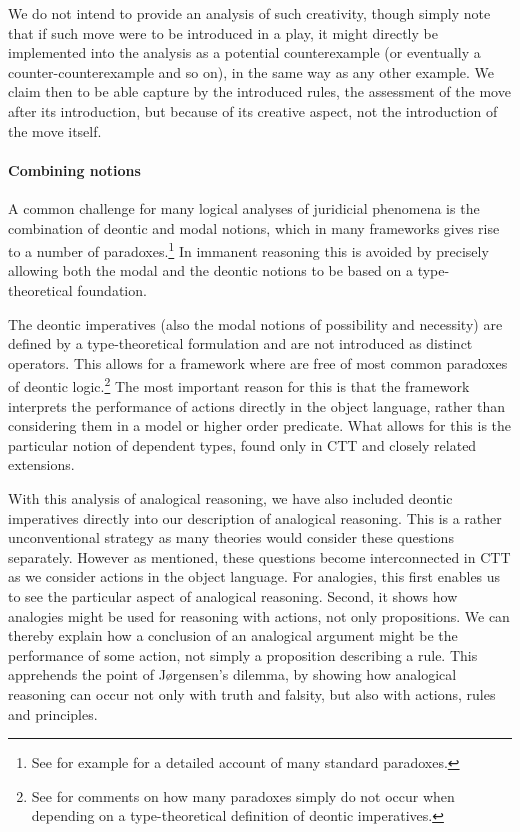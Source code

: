 				We do not intend to provide an analysis of such creativity, though simply note that if such move were to be introduced in a play, it might directly be implemented into the analysis as a potential counterexample (or eventually a counter-counterexample and so on), in the same way as any other example. We claim then to be able capture by the introduced rules, the assessment of the move after its introduction, but because of its creative aspect, not the introduction of the move itself. 
				
				\paragraph{Combining notions}
				
				A common challenge for many logical analyses of juridicial phenomena is the combination of deontic and modal notions, which in many frameworks gives rise to a number of paradoxes.\footnote{See for example \textcite{navarro2014deontic} for a detailed account of many standard paradoxes.} In immanent reasoning this is avoided by precisely allowing both the modal and the deontic notions to be based on a type-theoretical foundation. 
				
				The deontic imperatives (also the modal notions of possibility and necessity) are defined by a type-theoretical formulation and are not introduced as distinct operators. This allows for a framework where are free of most common paradoxes of deontic logic.\footnote{See \textcite{Rahman2019} for comments on how many paradoxes simply do not occur when depending on a type-theoretical definition of deontic imperatives.} The most important reason for this is that the framework interprets the performance of actions directly in the object language, rather than considering them in a model or higher order predicate. What allows for this is the particular notion of dependent types, found only in CTT and closely related extensions. 
				
				With this analysis of analogical reasoning, we have also included deontic imperatives directly into our description of analogical reasoning. This is a rather unconventional strategy as many theories would consider these questions separately. However as mentioned, these questions become interconnected in CTT as we consider actions in the object language. For analogies, this first enables us to see the particular aspect of analogical reasoning. Second, it shows how analogies might be used for reasoning with actions, not only propositions. We can thereby explain how a conclusion of an analogical argument might be the performance of some action, not simply a proposition describing a rule. This apprehends the point of Jørgensen's dilemma, by showing how analogical reasoning can occur not only with truth and falsity, but also with actions, rules and principles. 

